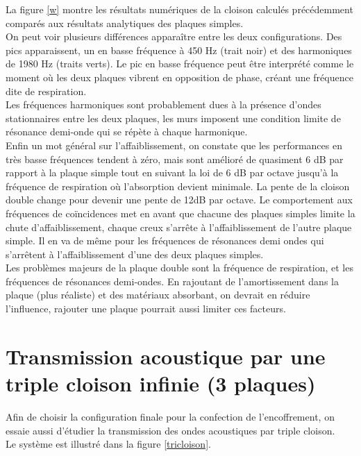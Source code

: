\documentclass[12pt,foolscap]{report}
\begin{document}
	La figure \ref{w} montre les résultats numériques de la cloison calculés précédemment comparés aux résultats analytiques des plaques simples.\\ On peut voir plusieurs différences apparaître entre les deux configurations. Des pics apparaissent, un en basse fréquence à 450 Hz (trait noir) et des harmoniques de 1980 Hz (traits verts). Le pic en basse fréquence peut être interprété comme le moment où les deux plaques vibrent en opposition de phase, créant une fréquence dite de respiration.\\
	Les fréquences harmoniques sont probablement dues à la présence d'ondes stationnaires entre les deux plaques, les murs imposent une condition limite de résonance demi-onde qui se répète à chaque harmonique.\\ 
	Enfin un mot général sur l'affaiblissement, on constate que les performances en très basse fréquences tendent à zéro, mais sont amélioré de quasiment 6 dB par rapport à la plaque simple tout   en suivant la loi de 6 dB par octave jusqu'à la fréquence de respiration où l'absorption devient minimale. La pente de la cloison double change pour devenir une pente de 12dB par octave. Le comportement aux fréquences de coïncidences met en avant que chacune des plaques simples limite la chute d'affaiblissement, chaque creux s'arrête à l'affaiblissement de l'autre plaque simple. Il en va de même pour les fréquences de résonances demi ondes qui s'arrêtent à l'affaiblissement d'une des deux plaques simples.\\
	Les problèmes majeurs de la plaque double sont la fréquence de respiration, et les fréquences de résonances demi-ondes. En rajoutant de l'amortissement dans la plaque (plus réaliste) et des matériaux absorbant, on devrait en réduire l'influence, rajouter une plaque pourrait aussi limiter ces facteurs.
	
	
	\section{ Transmission acoustique par une triple cloison infinie (3 plaques)}
	Afin de choisir la configuration finale pour la confection de l'encoffrement, on essaie aussi d'étudier la transmission des ondes acoustiques par triple cloison.\\
	Le système est illustré dans la figure \ref{tricloison}. \\
	
\end{document}
